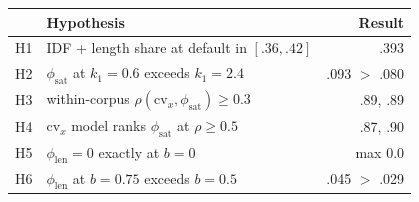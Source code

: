 \begin{tabular}{@{}llr@{}}
\toprule
 & Hypothesis & Result \\
\midrule
H1 & IDF + length share at default in $[.36, .42]$ & .393 \\
H2 & $\phi_{\mathrm{sat}}$ at $k_1 = 0.6$ exceeds $k_1 = 2.4$ & .093 $>$ .080 \\
H3 & within-corpus $\rho(\mathrm{cv}_x, \phi_{\mathrm{sat}}) \ge 0.3$ & .89, .89 \\
H4 & $\mathrm{cv}_x$ model ranks $\phi_{\mathrm{sat}}$ at $\rho \ge 0.5$ & .87, .90 \\
H5 & $\phi_{\mathrm{len}} = 0$ exactly at $b = 0$ & max $0.0$ \\
H6 & $\phi_{\mathrm{len}}$ at $b = 0.75$ exceeds $b = 0.5$ & .045 $>$ .029 \\
\bottomrule
\end{tabular}
